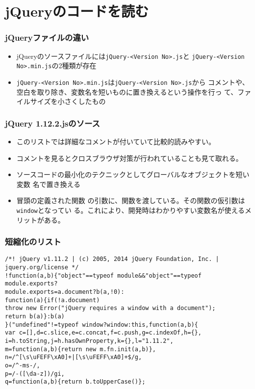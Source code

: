 \documentclass[dvipsk]{beamer}
\begin{document}
\section{jQueryのコードを読む}
\begin{frame}[containsverbatim]
 \frametitle{jQueryファイルの違い}
\begin{itemize}
 \item jQueryのソースファイルには\texttt{jQuery-<Version No>.js}と
\texttt{jQuery-<Version No>.min.js}の2種類が存在
 \item \texttt{jQuery-<Version No>.min.js}は\texttt{jQuery-<Version No>.js}から
コメントや、空白を取り除き、変数名を短いものに置き換えるという操作を行っ
て、ファイルサイズを小さくしたもの
\end{itemize}

\end{frame}
\begin{frame}[containsverbatim]
 \frametitle{jQuery 1.12.2.jsのソース}
 \begin{itemize}
  \item このリストでは詳細なコメントが付いていて比較的読みやすい。
  \item コメントを見るとクロスブラウザ対策が行われていることも見て取れる。
  \item ソースコードの最小化のテクニックとしてグローバルなオブジェクトを短い変数
名で置き換える
  \item 冒頭の定義された関数
の引数に、関数を渡している。その関数の仮引数は\texttt{window}となってい
る。これにより、開発時はわかりやすい変数名が使えるメリットがある。
 \end{itemize}
\end{frame}
\begin{frame}[containsverbatim]
\frametitle{短縮化のリスト}
{\scriptsize
\begin{verbatim}
/*! jQuery v1.11.2 | (c) 2005, 2014 jQuery Foundation, Inc. | jquery.org/license */
!function(a,b){"object"==typeof module&&"object"==typeof module.exports?
module.exports=a.document?b(a,!0):
function(a){if(!a.document)
throw new Error("jQuery requires a window with a document");
return b(a)}:b(a)
}("undefined"!=typeof window?window:this,function(a,b){
var c=[],d=c.slice,e=c.concat,f=c.push,g=c.indexOf,h={},
i=h.toString,j=h.hasOwnProperty,k={},l="1.11.2",
m=function(a,b){return new m.fn.init(a,b)},
n=/^[\s\uFEFF\xA0]+|[\s\uFEFF\xA0]+$/g,
o=/^-ms-/,
p=/-([\da-z])/gi,
q=function(a,b){return b.toUpperCase()};
\end{verbatim}
}
\end{frame}
\end{document}
